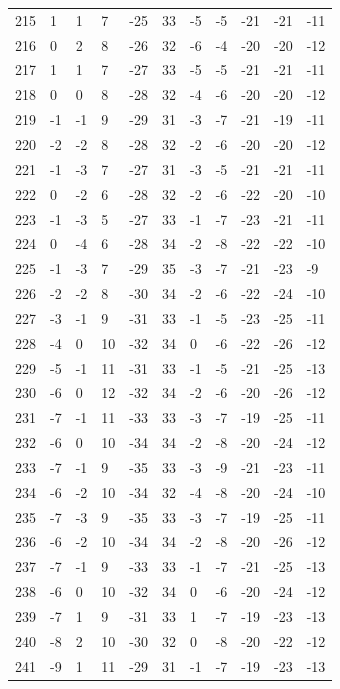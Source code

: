 \begin{table}[H]
\begin{tabular}{lllllllllll}
215 & 1 & 1 & 7 & -25 & 33 & -5 & -5 & -21 & -21 & -11 \\
216 & 0 & 2 & 8 & -26 & 32 & -6 & -4 & -20 & -20 & -12 \\
217 & 1 & 1 & 7 & -27 & 33 & -5 & -5 & -21 & -21 & -11 \\
218 & 0 & 0 & 8 & -28 & 32 & -4 & -6 & -20 & -20 & -12 \\
219 & -1 & -1 & 9 & -29 & 31 & -3 & -7 & -21 & -19 & -11 \\
220 & -2 & -2 & 8 & -28 & 32 & -2 & -6 & -20 & -20 & -12 \\
221 & -1 & -3 & 7 & -27 & 31 & -3 & -5 & -21 & -21 & -11 \\
222 & 0 & -2 & 6 & -28 & 32 & -2 & -6 & -22 & -20 & -10 \\
223 & -1 & -3 & 5 & -27 & 33 & -1 & -7 & -23 & -21 & -11 \\
224 & 0 & -4 & 6 & -28 & 34 & -2 & -8 & -22 & -22 & -10 \\
225 & -1 & -3 & 7 & -29 & 35 & -3 & -7 & -21 & -23 & -9 \\
226 & -2 & -2 & 8 & -30 & 34 & -2 & -6 & -22 & -24 & -10 \\
227 & -3 & -1 & 9 & -31 & 33 & -1 & -5 & -23 & -25 & -11 \\
228 & -4 & 0 & 10 & -32 & 34 & 0 & -6 & -22 & -26 & -12 \\
229 & -5 & -1 & 11 & -31 & 33 & -1 & -5 & -21 & -25 & -13 \\
230 & -6 & 0 & 12 & -32 & 34 & -2 & -6 & -20 & -26 & -12 \\
231 & -7 & -1 & 11 & -33 & 33 & -3 & -7 & -19 & -25 & -11 \\
232 & -6 & 0 & 10 & -34 & 34 & -2 & -8 & -20 & -24 & -12 \\
233 & -7 & -1 & 9 & -35 & 33 & -3 & -9 & -21 & -23 & -11 \\
234 & -6 & -2 & 10 & -34 & 32 & -4 & -8 & -20 & -24 & -10 \\
235 & -7 & -3 & 9 & -35 & 33 & -3 & -7 & -19 & -25 & -11 \\
236 & -6 & -2 & 10 & -34 & 34 & -2 & -8 & -20 & -26 & -12 \\
237 & -7 & -1 & 9 & -33 & 33 & -1 & -7 & -21 & -25 & -13 \\
238 & -6 & 0 & 10 & -32 & 34 & 0 & -6 & -20 & -24 & -12 \\
239 & -7 & 1 & 9 & -31 & 33 & 1 & -7 & -19 & -23 & -13 \\
240 & -8 & 2 & 10 & -30 & 32 & 0 & -8 & -20 & -22 & -12 \\
241 & -9 & 1 & 11 & -29 & 31 & -1 & -7 & -19 & -23 & -13 \\

\end{tabular}
\end{table}
